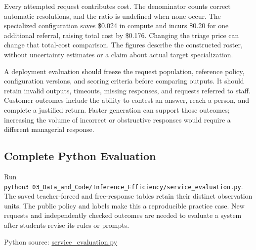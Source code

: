 Every attempted request contributes cost. The denominator counts correct
automatic resolutions, and the ratio is undefined when none occur. The
specialized configuration saves \$0.024 in compute and incurs \$0.20 for
one additional referral, raising total cost by \$0.176. Changing the
triage price can change that total-cost comparison. The figures describe
the constructed roster, without uncertainty estimates or a claim about
actual target specialization.

A deployment evaluation should freeze the request population, reference
policy, configuration versions, and scoring criteria before comparing
outputs. It should retain invalid outputs, timeouts, missing responses,
and requests referred to staff. Customer outcomes include the ability to
contest an answer, reach a person, and complete a justified return.
Faster generation can support those outcomes; increasing the volume of
incorrect or obstructive responses would require a different managerial
response.

\hypertarget{M07-complete-python-evaluation}{%
\subsection{Complete Python
Evaluation}\label{M07-complete-python-evaluation}}

\noindent \noindent Run
\texttt{python3\ 03\_Data\_and\_Code/Inference\_Efficiency/service\_evaluation.py}.
The saved teacher-forced and free-response tables retain their distinct
observation units. The public policy and labels make this a reproducible
practice case. New requests and independently checked outcomes are
needed to evaluate a system after students revise its rules or prompts.

\FloatBarrier
{}
Python source:
\href{../03_Data_and_Code/Inference_Efficiency/service_evaluation.py}{service\_evaluation.py}

